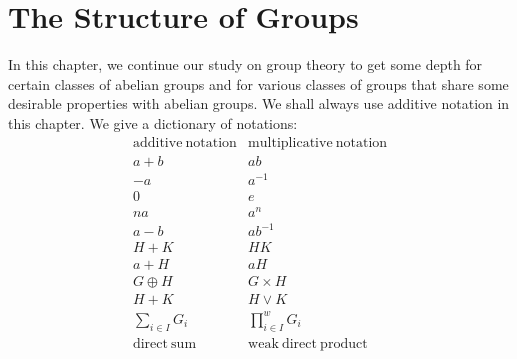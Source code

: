 \section{The Structure of Groups}
In this chapter, we continue our study on group theory to get some depth for certain classes of abelian groups and for various classes of groups that share some desirable properties with abelian groups. We shall always use additive notation in this chapter. We give a dictionary of notations: 
$$
\begin{matrix}
	\mathrm{additive}\ \mathrm{notation}&		\mathrm{multiplicative}\ \mathrm{notation}\\
	a+b&		ab\\
	-a&		a^{-1}\\
	0&		e\\
	na&		a^n\\
	a-b&		ab^{-1}\\
	H+K&		HK\\
	a+H&		aH\\
	G\oplus H&		G\times H\\
	H+K&		H\lor K\\
	\sum_{i\in I}{G_i}&		{\prod}^w_{i\in I}{G_i}\\
	\mathrm{direct}\ \mathrm{sum}&		\mathrm{weak}\ \mathrm{direct}\ \mathrm{product}\\
\end{matrix}
$$
